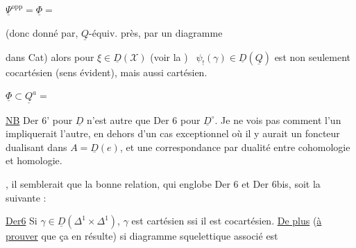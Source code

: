 $\underline\Psi^{\mathrm{opp}}=\underline\Phi={}$

(donc donné par, $\underline Q$-équiv. près, par un diagramme



dans Cat) alors pour $\xi\in\underline D(\mathcal X)$  (voir la ) \ $\psi_!(\gamma)\in\underline D(\underline Q)$ est non seulement cocartésien (sens évident), mais aussi cartésien.

$\underline\Phi\subset\underline Q^a={}$

\uline{NB} Der 6' pour $\underline D$  n'est autre que Der 6 pour $\underline D^\circ$. Je ne vois pas comment l'un impliquerait l'autre, en dehors d'un cas exceptionnel où il y aurait  un foncteur dualisant dans $A=\underline D(e)$, et une correspondance par dualité entre cohomologie et homologie.

, il semblerait que la bonne relation, qui englobe Der 6 et Der 6bis, soit la suivante :



\uline{Der6} Si $\gamma\in\underline D(\Delta^1\times\Delta^1)$, $\gamma$ est cartésien ssi il est cocartésien. \uline{De plus} (\uline{à prouver} que ça en résulte) si diagramme squelettique associé est


